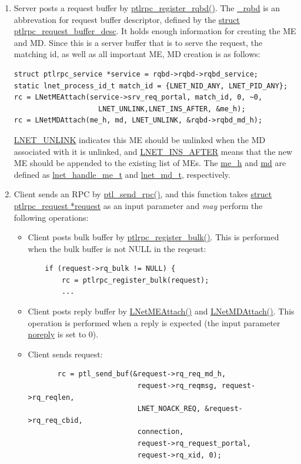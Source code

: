 \begin{enumerate}

\item Server posts a request buffer by \url{ptlrpc_register_rqbd()}. The \url{_rqbd}
is an abbrevation for request buffer descriptor, defined by the
\url{struct ptlrpc_request_buffer_desc}. It holds enough information for
creating the ME and MD. Since this is a server buffer that is to serve the request,
the matching id, as well as all important ME, MD creation is as follows:

\begin{Verbatim}
struct ptlrpc_service *service = rqbd->rqbd->rqbd_service;
static lnet_process_id_t match_id = {LNET_NID_ANY, LNET_PID_ANY};
rc = LNetMEAttach(service->srv_req_portal, match_id, 0, ~0,
                    LNET_UNLINK,LNET_INS_AFTER, &me_h);
rc = LNetMDAttach(me_h, md, LNET_UNLINK, &rqbd->rqbd_md_h);
\end{Verbatim}

\url{LNET_UNLINK} indicates this ME should be unlinked when the MD associated
with it is unlinked, and \url{LNET_INS_AFTER} means that the new ME should be
appended to the existing list of MEs. The \url{me_h} and \url{md} are defined as
\url{lnet_handle_me_t} and \url{lnet_md_t}, respectively.

\item Client sends an RPC by \url{ptl_send_rpc()}, and this function takes
\url{struct ptlrpc_request *request} as an input parameter and \textit{may}
perform the following operations:

  \begin{itemize}

  \item Client posts bulk buffer by \url{ptlrpc_register_bulk()}. This is performed
  when the bulk buffer is not NULL in the reqeust:

  \begin{Verbatim}
    if (request->rq_bulk != NULL) {
        rc = ptlrpc_register_bulk(request);
        ...
   \end{Verbatim}

  \item Client posts reply buffer by \url{LNetMEAttach()} and \url{LNetMDAttach()}.
  This operation is performed when a reply is expected (the input parameter
  \url{noreply} is set to 0).

  \item Client sends request: 
  \begin{Verbatim}
       rc = ptl_send_buf(&request->rq_req_md_h,
                          request->rq_reqmsg, request->rq_reqlen,
                          LNET_NOACK_REQ, &request->rq_req_cbid,
                          connection,
                          request->rq_request_portal,
                          request->rq_xid, 0);
  \end{Verbatim}


\end{itemize}
\end{enumerate}
